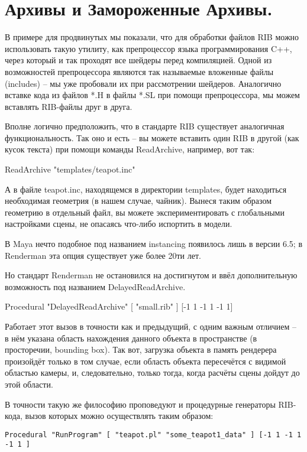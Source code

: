 \section*{Архивы и Замороженные Архивы.}
  

 В примере для продвинутых мы показали, что для
    обработки файлов RIB можно использовать такую утилиту, как
    препроцессор языка программирования C++, через который и так
    проходят все шейдеры перед компиляцией. Одной из возможностей
    препроцессора являются так называемые вложенные файлы (includes) –
    мы уже пробовали их при рассмотрении шейдеров. Аналогично вставке
    кода из файлов *.H в файлы *.SL при помощи препроцессора, мы можем
    вставлять RIB-файлы друг в друга.
  

 Вполне логично предположить, что в стандарте RIB
    существует аналогичная функциональность. Так оно и есть – вы можете
    вставить один RIB в другой (как кусок текста) при помощи команды
    ReadArchive, например, вот так:
  

 ReadArchive "templates/teapot.inc"
  

 А в файле teapot.inc, находящемся в директории
    templates, будет находиться необходимая геометрия (в нашем случае,
    чайник). Вынеся таким образом геометрию в отдельный файл, вы можете
    экспериментировать с глобальными настройками сцены, не опасаясь
    что-либо испортить в модели.
  

 В Maya нечто подобное под названием instancing
    появилось лишь в версии 6.5; в Renderman эта опция существует уже
    более 20ти лет.
  

 Но стандарт Renderman не остановился на достигнутом
    и ввёл дополнительную возможность под названием
    DelayedReadArchive.
  

Procedural  "DelayedReadArchive"
    [ "small.rib"
    ] [-1 1 -1 1 -1 1]
  

 Работает этот вызов в точности как и предыдущий, с
    одним важным отличием – в нём указана область нахождения данного
    объекта в пространстве (в просторечии, bounding box). Так вот,
    загрузка объекта в память рендерера произойдёт только в том случае,
    если область объекта пересечётся с видимой областью камеры, и,
    следовательно,  только
    тогда, когда расчёты сцены дойдут до этой области.
  

 В точности такую же философию проповедуют и
    процедурные генераторы RIB-кода, вызов которых можно осуществлять
    таким образом:
  
\begin{lstlisting}[frame=single, framerule=0pt, framesep=10pt, xleftmargin=10pt, xrightmargin=10pt]
Procedural "RunProgram" [ "teapot.pl" "some_teapot1_data" ] [-1 1 -1 1 -1 1 ]
\end{lstlisting}
  


